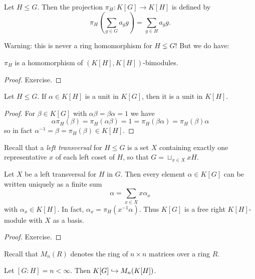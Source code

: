 \begin{definition}
    Let $H \leq G$.
    Then the projection $\pi_H \colon K[G] \to K[H]$ is defined by \[
        \pi_H(\sum_{g \in G} a_g g) = \sum_{g \in H} a_g g.
    \]
\end{definition}

Warning: this is never a ring homomorphism for $H \lneq G$! But we do have:

\begin{lemma}
    \label{lem:KH_bimodule_hom}
    $\pi_H$ is a homomorphism of $(K[H], K[H])$-bimodules.
\end{lemma}

\begin{proof}
    Exercise.
\end{proof}

\begin{corollary}
    Let $H \leq G$.
    If $\alpha \in K[H]$ is a unit in $K[G]$, then it is a unit in $K[H]$.
\end{corollary}

\begin{proof}
    For $\beta \in K[G]$ with $\alpha \beta = \beta \alpha = 1$ we have \[
        \alpha \pi_H(\beta) = \pi_H(\alpha \beta) = 1 = \pi_H(\beta \alpha) = \pi_H(\beta) \alpha
    \] so in fact $\alpha^{-1} = \beta = \pi_H(\beta) \in K[H]$.
\end{proof}

Recall that a \emph{left transversal} for $H \leq G$ is a set $X$ containing exactly one representative $x$ of each left coset of $H$, so that $G = \sqcup_{x \in X} x H$.

\begin{lemma}
    Let $X$ be a left transversal for $H$ in $G$.
    Then every element $\alpha \in K[G]$ can be written uniquely as a finite sum \[
        \alpha = \sum_{x \in X} x \alpha_x
    \] with $\alpha_x \in K[H]$. In fact, $\alpha_x = \pi_H(x^{-1} \alpha)$.
    Thus $K[G]$ is a free right $K[H]$-module with $X$ as a basis.
\end{lemma}

\begin{proof}
    Exercise.
\end{proof}

Recall that $M_n(R)$ denotes the ring of $n \times n$ matrices over a ring $R$.

\begin{lemma}
    \label{lemma:KG_in_MnKH}
    Let $[G : H] = n < \infty$.
    Then $K[G] \hookrightarrow M_n(K[H])$.
\end{lemma}

